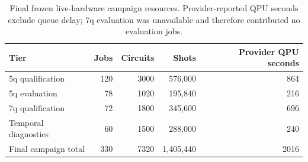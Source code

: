 \begin{table}[t]
\centering
\small
\caption{Final frozen live-hardware campaign resources. Provider-reported QPU seconds exclude queue delay; 7q evaluation was unavailable and therefore contributed no evaluation jobs.}
\label{tab:hardware-campaign-resource}
\begin{tabular}{@{}lrrrr@{}}
\toprule
\textbf{Tier} & \textbf{Jobs} & \textbf{Circuits} & \textbf{Shots} & \textbf{Provider QPU seconds} \\
\midrule
5q qualification & 120 & 3000 & 576,000 & 864 \\
5q evaluation & 78 & 1020 & 195,840 & 216 \\
7q qualification & 72 & 1800 & 345,600 & 696 \\
Temporal diagnostics & 60 & 1500 & 288,000 & 240 \\
Final campaign total & 330 & 7320 & 1,405,440 & 2016 \\
\bottomrule
\end{tabular}
\end{table}
